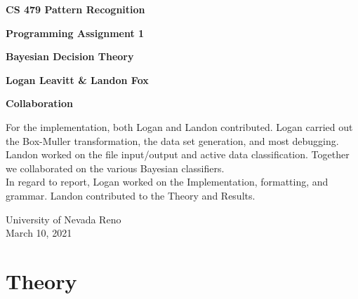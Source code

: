 \documentclass[ 12pt ]{article}
\begin{document}
\begin{titlepage}
    \begin{center}
        \vspace*{1cm}
            
        \LARGE
        \textbf{CS 479 Pattern Recognition}

        \vspace{0.5cm}
        \LARGE
        \textbf{Programming Assignment 1}

        \vspace{0.1cm}
        \LARGE
        \textbf{Bayesian Decision Theory}
            
        \vspace{1.5cm}
            
        \textbf{Logan Leavitt \& Landon Fox}
            
        \vfill
        \Large
        \textbf{Collaboration}

        \vspace{0.1cm}
        \large
        For the implementation, both Logan and Landon contributed. Logan carried out the Box-Muller transformation, the data set generation, and most debugging. Landon worked on the
        file input/output and active data classification. Together we collaborated on the various Bayesian classifiers. \\
        In regard to report, Logan worked on the Implementation, formatting, and grammar. Landon contributed to the Theory and Results.
            
        \vspace{0.8cm}
            
            
        \Large
        University of Nevada Reno\\
        March 10, 2021
            
    \end{center}
\end{titlepage}


\section*{Theory}
\end{document}

